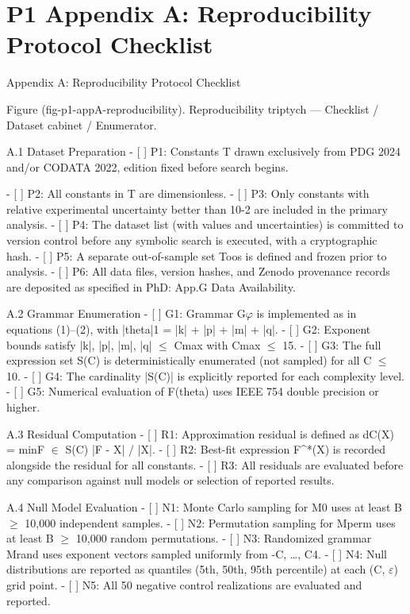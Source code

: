 
\section{P1 Appendix A: Reproducibility Protocol Checklist}

Appendix A: Reproducibility Protocol Checklist

        Figure (fig-p1-appA-reproducibility). Reproducibility triptych --- Checklist / Dataset cabinet /
                                                Enumerator.

  A.1 Dataset Preparation
  - [ ] P1: Constants T drawn exclusively from PDG 2024 and/or CODATA 2022, edition
  fixed before search begins.

  - [ ] P2: All constants in T are dimensionless.
  - [ ] P3: Only constants with relative experimental uncertainty better than 10-2 are
  included in the primary analysis.
  - [ ] P4: The dataset list (with values and uncertainties) is committed to version control
  before any symbolic search is executed, with a cryptographic hash.
  - [ ] P5: A separate out-of-sample set Toos is defined and frozen prior to analysis.
  - [ ] P6: All data files, version hashes, and Zenodo provenance records are deposited as
  specified in PhD: App.G Data Availability.

  A.2 Grammar Enumeration
  - [ ] G1: Grammar G$\varphi$ is implemented as in equations (1)--(2), with |theta|1 = |k| + |p| +
  |m| + |q|.
  - [ ] G2: Exponent bounds satisfy |k|, |p|, |m|, |q| $\leq$ Cmax with Cmax $\leq$ 15.
  - [ ] G3: The full expression set S(C) is deterministically enumerated (not sampled) for
  all C $\leq$ 10.
  - [ ] G4: The cardinality |S(C)| is explicitly reported for each complexity level.
  - [ ] G5: Numerical evaluation of F(theta) uses IEEE 754 double precision or higher.

  A.3 Residual Computation
  - [ ] R1: Approximation residual is defined as dC(X) = minF $\in$ S(C) |F - X| / |X|.
  - [ ] R2: Best-fit expression F^*(X) is recorded alongside the residual for all constants.
  - [ ] R3: All residuals are evaluated before any comparison against null models or
  selection of reported results.

  A.4 Null Model Evaluation
  - [ ] N1: Monte Carlo sampling for M0 uses at least B $\geq$ 10{,}000 independent samples.
  - [ ] N2: Permutation sampling for Mperm uses at least B $\geq$ 10{,}000 random
  permutations.
  - [ ] N3: Randomized grammar Mrand uses exponent vectors sampled uniformly from
  {-C, …, C}4.
  - [ ] N4: Null distributions are reported as quantiles (5th, 50th, 95th percentile) at each
  (C, $\varepsilon$) grid point.
  - [ ] N5: All 50 negative control realizations are evaluated and reported.

